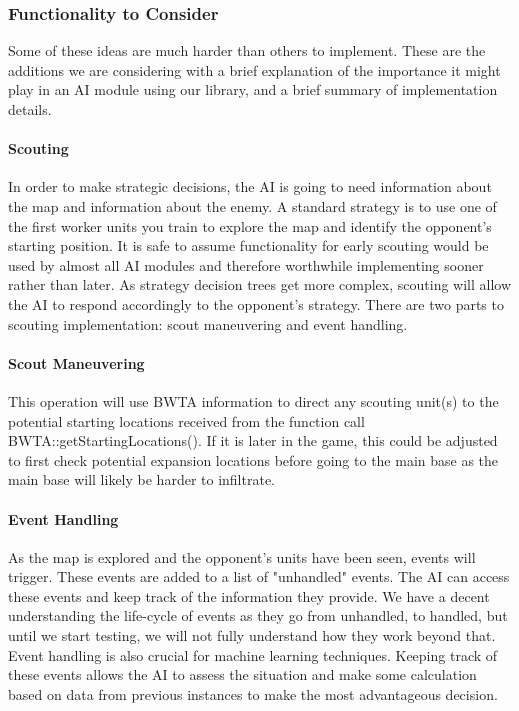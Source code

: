 \documentclass[10pt,letterpaper,onecolumn,draftclsnofoot]{IEEEtran}
\begin{document}
	\subsubsection{Functionality to Consider}
	Some of these ideas are much harder than others to implement. These are the additions we are considering with a brief explanation of the importance it might play in an AI module using our library, and a brief summary of implementation details.
	\paragraph{Scouting}
	In order to make strategic decisions, the AI is going to need information about the map and information about the enemy. A standard strategy is to use one of the first worker units you train to explore the map and identify the opponent's starting position. It is safe to assume functionality for early scouting would be used by almost all AI modules and therefore worthwhile implementing sooner rather than later. As strategy decision trees get more complex, scouting will allow the AI to respond accordingly to the opponent's strategy. There are two parts to scouting implementation: scout maneuvering and event handling.
	\paragraph{Scout Maneuvering}
	This operation will use BWTA information to direct any scouting unit(s) to the potential starting locations received from the function call BWTA::getStartingLocations(). If it is later in the game, this could be adjusted to first check potential expansion locations before going to the main base as the main base will likely be harder to infiltrate. 
	\paragraph{Event Handling}
	As the map is explored and the opponent's units have been seen, events will trigger. These events are added to a list of "unhandled" events. The AI can access these events and keep track of the information they provide. We have a decent understanding the life-cycle of events as they go from unhandled, to handled, but until we start testing, we will not fully understand how they work beyond that.
	Event handling is also crucial for machine learning techniques. Keeping track of these events allows the AI to assess the situation and make some calculation based on data from previous instances to make the most advantageous decision.  
\end{document}
